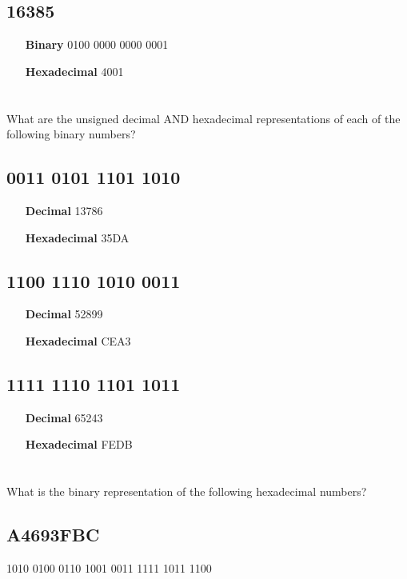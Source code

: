 \documentclass{article}
\begin{document}
\subsection{16385}
\begin{itemize}
	\item[\textbf{Binary}] 0100 0000 0000 0001
	\item[\textbf{Hexadecimal}] 4001
\end{itemize}

\section{}
What are the unsigned decimal AND hexadecimal representations of each of the following binary numbers?

\subsection{0011 0101 1101 1010}
\begin{itemize}
	\item[\textbf{Decimal}] 13786
	\item[\textbf{Hexadecimal}] 35DA
\end{itemize}

\subsection{1100 1110 1010 0011}
\begin{itemize}
	\item[\textbf{Decimal}] 52899
	\item[\textbf{Hexadecimal}] CEA3
\end{itemize}

\subsection{1111 1110 1101 1011}
\begin{itemize}
	\item[\textbf{Decimal}] 65243
	\item[\textbf{Hexadecimal}] FEDB
\end{itemize}

\section{}
What is the binary representation of the following hexadecimal numbers?

\subsection{A4693FBC}
1010 0100 0110 1001 0011 1111 1011 1100
\end{document}
